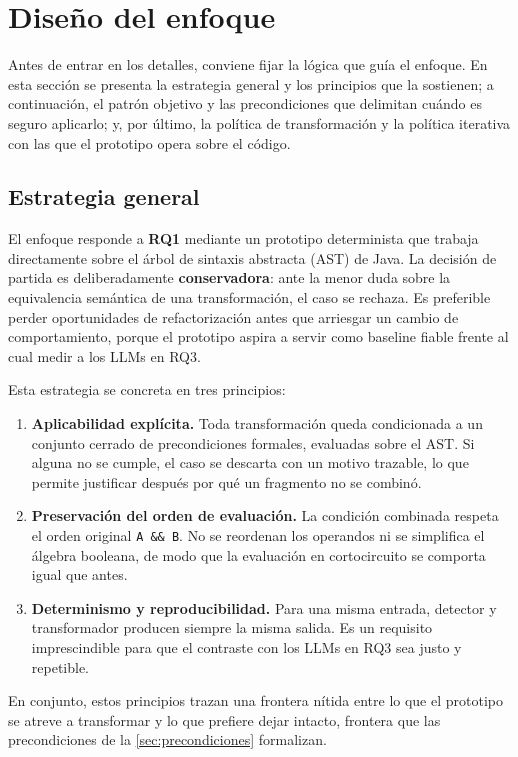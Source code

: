 
\section{Diseño del enfoque}
\label{sec:diseno}

Antes de entrar en los detalles, conviene fijar la lógica que guía el
enfoque. En esta sección se presenta la estrategia general y los
principios que la sostienen; a continuación, el patrón objetivo y las
precondiciones que delimitan cuándo es seguro aplicarlo; y, por último, la
política de transformación y la política iterativa con las que el
prototipo opera sobre el código.

\subsection{Estrategia general}
El enfoque responde a \textbf{RQ1} mediante un prototipo determinista que
trabaja directamente sobre el árbol de sintaxis abstracta (AST) de Java.
La decisión de partida es deliberadamente \textbf{conservadora}: ante la
menor duda sobre la equivalencia semántica de una transformación, el caso
se rechaza. Es preferible perder oportunidades de refactorización antes que
arriesgar un cambio de comportamiento, porque el prototipo aspira a servir
como baseline fiable frente al cual medir a los LLMs en RQ3.

Esta estrategia se concreta en tres principios:

\begin{enumerate}
  \item \textbf{Aplicabilidad explícita.} Toda transformación queda
  condicionada a un conjunto cerrado de precondiciones formales, evaluadas
  sobre el AST. Si alguna no se cumple, el caso se descarta con un motivo
  trazable, lo que permite justificar después por qué un fragmento no se
  combinó.
  \item \textbf{Preservación del orden de evaluación.} La condición
  combinada respeta el orden original \lstinline|A && B|. No se reordenan
  los operandos ni se simplifica el álgebra booleana, de modo que la
  evaluación en cortocircuito se comporta igual que antes.
  \item \textbf{Determinismo y reproducibilidad.} Para una misma entrada,
  detector y transformador producen siempre la misma salida. Es un
  requisito imprescindible para que el contraste con los LLMs en RQ3 sea
  justo y repetible.
\end{enumerate}

En conjunto, estos principios trazan una frontera nítida entre lo que el
prototipo se atreve a transformar y lo que prefiere dejar intacto, frontera
que las precondiciones de la \autoref{sec:precondiciones} formalizan.


